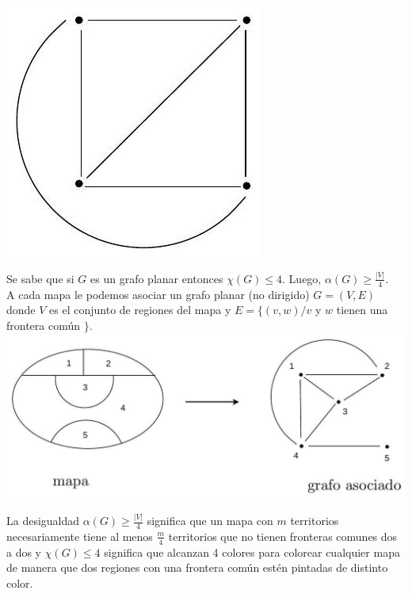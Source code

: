 \documentclass[10pt]{article}
\begin{document}
\includegraphics[max width=\textwidth, center]{2025_09_05_b69e29efaf9a6d2aa81ag-07}

Se sabe que si $G$ es un grafo planar entonces $\chi(G) \leq 4$. Luego, $\alpha(G) \geq \frac{|V|}{4}$.\\
A cada mapa le podemos asociar un grafo planar (no dirigido) $G=(V, E)$ donde $V$ es el conjunto de regiones del mapa y $E=\{(v, w) / v$ y $w$ tienen una frontera común $\}$.\\
\includegraphics[max width=\textwidth, center]{2025_09_05_b69e29efaf9a6d2aa81ag-07(1)}

La desigualdad $\alpha(G) \geq \frac{|V|}{4}$ significa que un mapa con $m$ territorios necesariamente tiene al menos $\frac{m}{4}$ territorios que no tienen fronteras comunes dos a dos y $\chi(G) \leq 4$ significa que alcanzan 4 colores para colorear cualquier mapa de manera que dos regiones con una frontera común estén pintadas de distinto color.
\end{document}
